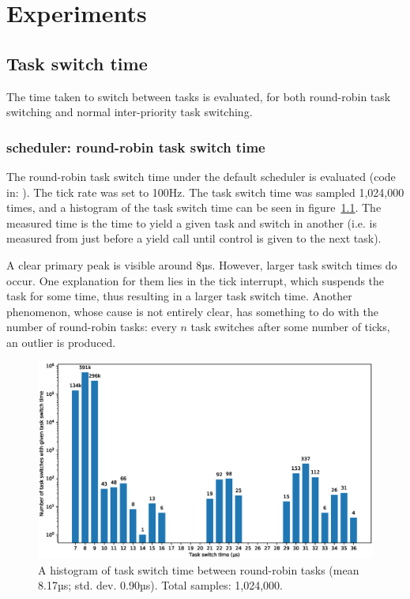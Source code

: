 \chapter{Experiments}
\section{Task switch time}
The time taken to switch between tasks is evaluated, for both round-robin task switching and normal inter-priority task switching.

\subsection{\ucosiii scheduler: round-robin task switch time}
The round-robin task switch time under the default \ucosiii scheduler is evaluated (code in: ). The tick rate was set to 100Hz. The task switch time was sampled 1,024,000 times, and a histogram of the task switch time can be seen in figure~\ref{fig:rrhist}. The measured time is the time to yield a given task and switch in another (i.e. is measured from just before a yield call until control is given to the next task).

A clear primary peak is visible around 8µs. However, larger task switch times do occur. One explanation for them lies in the tick interrupt, which suspends the task for some time, thus resulting in a larger task switch time. Another phenomenon, whose cause is not entirely clear, has something to do with the number of round-robin tasks:  every $n$ task switches after some number of ticks, an outlier is produced.

\begin{figure}[htpb]
    \centering
    \includegraphics[width=\textwidth]{figures/task_switch_time.eps}
    \caption{A histogram of task switch time between round-robin tasks (mean 8.17µs; std. dev. 0.90µs). Total samples: 1,024,000.}
    \label{fig:rrhist}
\end{figure}

